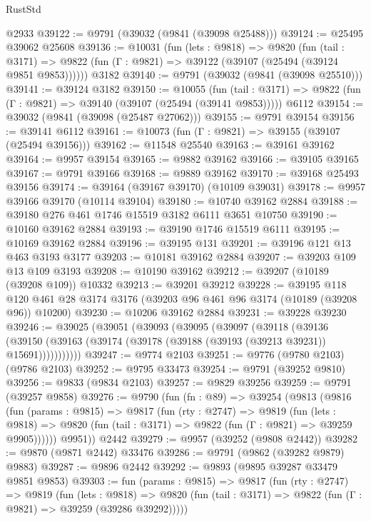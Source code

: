 \begin{lexlean}{RustStd}
\begin{coremodule}
    @2933
@39122 := @9791 (@39032 (@9841 (@39098 @25488)))
@39124 := @25495 @39062 @25608
@39136 := @10031
    (fun (lets : @9818) =>
    @9820
      (fun (tail : @3171) =>
      @9822 (fun (Γ : @9821) => @39122 (@39107 (@25494 (@39124 @9851 @9853))))))
    @3182
@39140 := @9791 (@39032 (@9841 (@39098 @25510)))
@39141 := @39124 @3182
@39150 := @10055
    (fun (tail : @3171) => @9822 (fun (Γ : @9821) => @39140 (@39107 (@25494 (@39141 @9853)))))
    @6112
@39154 := @39032 (@9841 (@39098 (@25487 @27062)))
@39155 := @9791 @39154
@39156 := @39141 @6112
@39161 := @10073 (fun (Γ : @9821) => @39155 (@39107 (@25494 @39156)))
@39162 := @11548 @25540
@39163 := @39161 @39162
@39164 := @9957 @39154
@39165 := @9882 @39162
@39166 := @39105 @39165
@39167 := @9791 @39166
@39168 := @9889 @39162
@39170 := @39168 @25493 @39156
@39174 := @39164 (@39167 @39170) (@10109 @39031)
@39178 := @9957 @39166 @39170 (@10114 @39104)
@39180 := @10740 @39162 @2884
@39188 := @39180 @276 @461 @1746 @15519 @3182 @6111 @3651 @10750
@39190 := @10160 @39162 @2884
@39193 := @39190 @1746 @15519 @6111
@39195 := @10169 @39162 @2884
@39196 := @39195 @131
@39201 := @39196 @121 @13 @463 @3193 @3177
@39203 := @10181 @39162 @2884
@39207 := @39203 @109 @13 @109 @3193
@39208 := @10190 @39162
@39212 := @39207 (@10189 (@39208 @109)) @10332
@39213 := @39201 @39212
@39228 := @39195
    @118
    @120
    @461
    @28
    @3174
    @3176
    (@39203 @96 @461 @96 @3174 (@10189 (@39208 @96)) @10200)
@39230 := @10206 @39162 @2884
@39231 := @39228 @39230
@39246 := @39025
    (@39051
      (@39093
        (@39095
          (@39097
            (@39118
              (@39136
                (@39150 (@39163 (@39174 (@39178 (@39188 (@39193 (@39213 @39231)) @15691)))))))))))
@39247 := @9774 @2103
@39251 := @9776 (@9780 @2103) (@9786 @2103)
@39252 := @9795 @33473
@39254 := @9791 (@39252 @9810)
@39256 := @9833 (@9834 @2103)
@39257 := @9829 @39256
@39259 := @9791 (@39257 @9858)
@39276 := @9790
    (fun (fn : @89) =>
    @39254
      (@9813
        (@9816
          (fun (params : @9815) =>
          @9817
            (fun (rty : @2747) =>
            @9819
              (fun (lets : @9818) =>
              @9820 (fun (tail : @3171) => @9822 (fun (Γ : @9821) => @39259 @9905))))))
        @9951))
    @2442
@39279 := @9957 (@39252 (@9808 @2442))
@39282 := @9870 (@9871 @2442) @33476
@39286 := @9791 (@9862 (@39282 @9879) @9883)
@39287 := @9896 @2442
@39292 := @9893 (@9895 @39287 @33479 @9851 @9853)
@39303 := fun (params : @9815) =>
  @9817
    (fun (rty : @2747) =>
    @9819
      (fun (lets : @9818) =>
      @9820 (fun (tail : @3171) => @9822 (fun (Γ : @9821) => @39259 (@39286 @39292)))))

\end{coremodule}
\end{lexlean}
